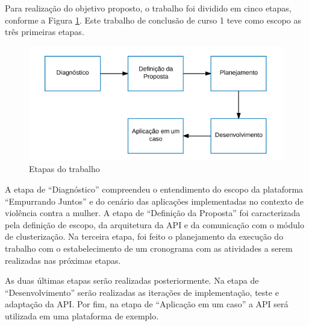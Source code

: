 
Para realização do objetivo proposto, o trabalho foi dividido em cinco etapas, conforme a Figura \ref{fig:etapas_trabalho}. 
Este trabalho de conclusão de curso 1 
teve como escopo as três primeiras etapas.

\begin{figure}[h!]
\centering
\includegraphics[scale=0.6]{figuras/etapas.png}
\caption{Etapas do trabalho}
\label{fig:etapas_trabalho}
\end{figure}

A etapa de ``Diagnóstico'' compreendeu o entendimento do escopo da plataforma ``Empurrando Juntos'' e do cenário das 
aplicações implementadas no contexto de violência contra a mulher. A etapa de ``Definição da Proposta'' foi caracterizada pela definição de escopo, 
da arquitetura da API e da comunicação com o módulo de clusterização. Na terceira etapa, foi feito o planejamento da execução do trabalho com o estabelecimento
de um cronograma com as atividades a serem realizadas nas próximas etapas. 

As duas últimas etapas serão realizadas posteriormente. Na etapa de ``Desenvolvimento''
serão realizadas as iterações de implementação, teste e adaptação da API. Por fim, na etapa de ``Aplicação em um caso'' a API será utilizada em uma 
plataforma de exemplo.



